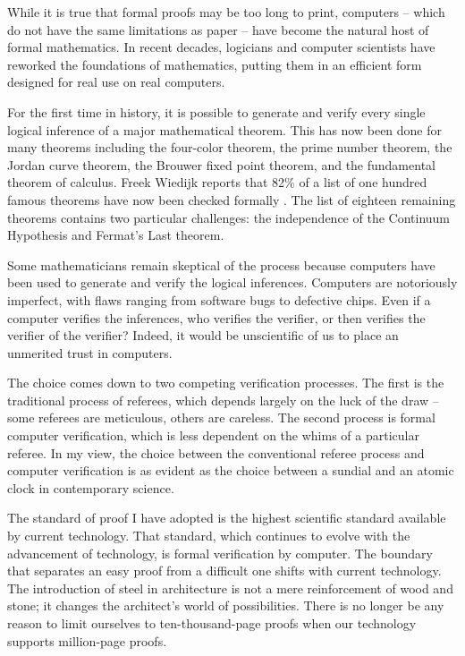 While it is true that formal proofs may be too long to print,
computers -- which do not have the same limitations as paper -- have
become the natural host of formal mathematics. In recent decades,
logicians and computer scientists have reworked the foundations of
mathematics, putting them in an efficient form designed for real use
on real computers.

For the first time in history, it is possible to generate and verify
every single logical inference of a major mathematical theorem.  This
has now been done for many theorems including the four-color theorem, the prime number
theorem, the Jordan curve theorem, the Brouwer fixed point theorem,
and the fundamental theorem of calculus.  Freek Wiedijk
reports that 82\% of a list of one hundred famous theorems have now been
checked formally \cite{wiedijk:100}.  The list of eighteen remaining
theorems contains two particular challenges: the independence of the
Continuum Hypothesis and Fermat's Last theorem.

Some mathematicians remain skeptical of the process because computers
have been used to generate and verify the logical inferences.
Computers are notoriously imperfect, with flaws ranging from software
bugs to defective chips.  Even if a computer verifies the inferences,
who  verifies the verifier, or then verifies the verifier of the
verifier?  Indeed, it would be unscientific of us to place an
unmerited trust in computers.

The choice comes down to two competing verification processes.  The
first is the traditional process of referees, which depends largely on
the luck of the draw -- some referees are meticulous, others are
careless.  The second process is formal computer verification, which
is less dependent on the whims of a particular referee.  In my view,
the choice between the conventional referee process and computer
verification is as evident as the choice between a sundial and an atomic
clock in contemporary science.

The standard of proof I have adopted is the highest scientific
standard available by current technology.  That standard, which
continues to evolve with the advancement of technology, is formal
verification by computer.
The boundary that separates an easy proof from a difficult
one shifts with current technology.  The introduction of steel in
architecture is not a mere reinforcement of wood and stone; it changes
the architect's world of possibilities.  There is no longer be any
reason to limit ourselves to ten-thousand-page proofs when our
technology supports million-page proofs.

